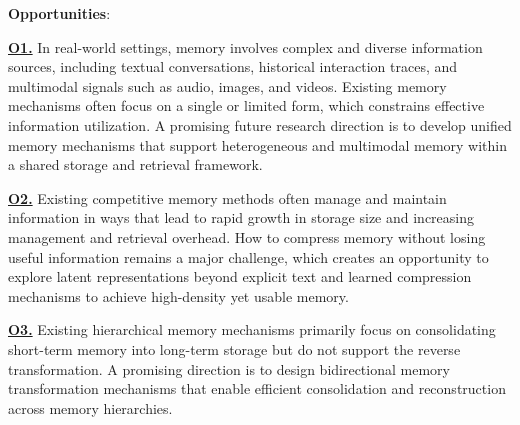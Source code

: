 \noindent \textbf{Opportunities}:

\noindent {} \textbf{\underline{O1.}}
In real-world settings, memory involves complex and diverse information sources, including textual conversations, historical interaction traces, and multimodal signals such as audio, images, and videos. Existing memory mechanisms often focus on a single or limited form, which constrains effective information utilization. A promising future research direction is to develop unified memory mechanisms that support heterogeneous and multimodal memory within a shared storage and retrieval framework.


\noindent {} \textbf{\underline{O2.}}
Existing competitive memory methods often manage and maintain information in ways that lead to rapid growth in storage size and increasing management and retrieval overhead. How to compress memory without losing useful information remains a major challenge, which creates an opportunity to explore latent representations beyond explicit text and learned compression mechanisms to achieve high-density yet usable memory.

\noindent {} \textbf{\underline{O3.}}
Existing hierarchical memory mechanisms primarily focus on consolidating short-term memory into long-term storage but do not support the reverse transformation. A promising direction is to design bidirectional memory transformation mechanisms that enable efficient consolidation and reconstruction across memory hierarchies.


